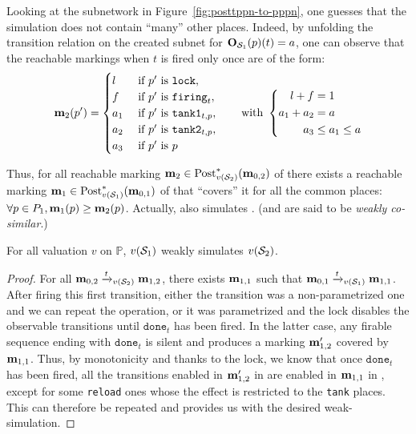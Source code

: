 Looking at the subnetwork in Figure~\ref{fig:posttppn-to-pppn},
one guesses that the simulation does not contain “many” other places.
Indeed, by unfolding the transition relation on the created subnet for $\mathbf{O}_{\mathcal{S}_1}(p)(t) = a$, one can observe that the reachable markings when $t$ is fired only once are of the form:
\[
  \mathbf{m}_2(p') =
  \begin{cases}
    l   &\text{ if } p' \text{ is } \mathtt{lock}, \\
    f   &\text{ if } p' \text{ is } \mathtt{firing}_t, \\
    a_1 &\text{ if } p' \text{ is } \mathtt{tank1}_{t,p}, \\
    a_2 &\text{ if } p' \text{ is } \mathtt{tank2}_{t,p}, \\
    a_3 &\text{ if } p' \text{ is } p
  \end{cases}
  \text{\qquad with }
  \left\{
    \begin{aligned}
      l + f &= 1 \\
      a_1 + a_2 &= a \\
      a_3 &\leq a_1 \leq a
    \end{aligned}
  \right.
\]

Thus, for all reachable marking $\mathbf{m}_2 \in \operatorname{Post}^*_{v(\mathcal{S}_2)}(\mathbf{m}_{0,2})$ of \PPNii there exists a reachable marking $\mathbf{m}_1 \in \operatorname{Post}^*_{v(\mathcal{S}_1)}(\mathbf{m}_{0,1})$ of \PPNi that ``covers'' it for all the common places: $\forall p \in P_1, \mathbf{m}_1(p) \geq \mathbf{m}_2(p)$.
Actually, \PPNi also simulates \PPNii.
(\PPNi and \PPNii are said to be \emph{weakly co-similar}.)

\begin{lemm}
  For all valuation $v$ on $\mathbb{P}$, $v(\mathcal{S}_1)$ weakly simulates $v(\mathcal{S}_2)$.
\end{lemm}

\begin{proof}
  For all $\mathbf{m}_{0,2} \xrightarrow{t}_{v(\mathcal{S}_2)} \mathbf{m}_{1,2}$, there exists $\mathbf{m}_{1,1}$ such that $\mathbf{m}_{0,1} \xrightarrow{t}_{v(\mathcal{S}_1)} \mathbf{m}_{1,1}$.
  After firing this first transition, either the transition was a non-parametrized one and we can repeat the operation, or it was parametrized and the lock disables the observable transitions until $\mathtt{done}_t$ has been fired.
  In the latter case, any firable sequence ending with $\mathtt{done}_t$ is silent and produces a marking $\mathbf{m}'_{1,2}$ covered by $\mathbf{m}_{1,1}$.
  Thus, by monotonicity and thanks to the lock, we know that once $\mathtt{done}_t$ has been fired, all the transitions enabled in $\mathbf{m}'_{1,2}$ in \PPNii are enabled in $\mathbf{m}_{1,1}$ in \PPNi, except for some \texttt{reload} ones whose the effect is restricted to the \texttt{tank} places.
  This can therefore be repeated and provides us with the desired weak-simulation.
\end{proof}


